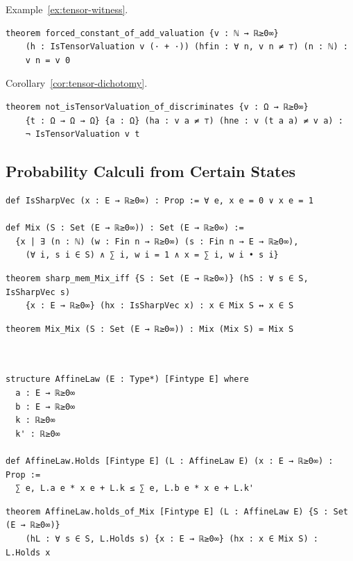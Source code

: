 \noindent Example~\ref{ex:tensor-witness}.
\label{lean:tensor-witness}
\begin{lstlisting}
theorem forced_constant_of_add_valuation {v : ℕ → ℝ≥0∞}
    (h : IsTensorValuation v (· + ·)) (hfin : ∀ n, v n ≠ ⊤) (n : ℕ) :
    v n = v 0
\end{lstlisting}

\noindent Corollary~\ref{cor:tensor-dichotomy}.
\label{lean:tensor-dichotomy}
\begin{lstlisting}
theorem not_isTensorValuation_of_discriminates {v : Ω → ℝ≥0∞}
    {t : Ω → Ω → Ω} {a : Ω} (ha : v a ≠ ⊤) (hne : v (t a a) ≠ v a) :
    ¬ IsTensorValuation v t
\end{lstlisting}
\subsection{Probability Calculi from Certain States}

\label{lean:mix}
\begin{lstlisting}
def IsSharpVec (x : E → ℝ≥0∞) : Prop := ∀ e, x e = 0 ∨ x e = 1

def Mix (S : Set (E → ℝ≥0∞)) : Set (E → ℝ≥0∞) :=
  {x | ∃ (n : ℕ) (w : Fin n → ℝ≥0∞) (s : Fin n → E → ℝ≥0∞),
    (∀ i, s i ∈ S) ∧ ∑ i, w i = 1 ∧ x = ∑ i, w i • s i}
\end{lstlisting}

\label{lean:sharp-mem-mix-iff}
\begin{lstlisting}
theorem sharp_mem_Mix_iff {S : Set (E → ℝ≥0∞)} (hS : ∀ s ∈ S, IsSharpVec s)
    {x : E → ℝ≥0∞} (hx : IsSharpVec x) : x ∈ Mix S ↔ x ∈ S
\end{lstlisting}

\label{lean:mix-mix}
\begin{lstlisting}
theorem Mix_Mix (S : Set (E → ℝ≥0∞)) : Mix (Mix S) = Mix S
\end{lstlisting}

\label{lean:affinelaw}
\begin{lstlisting}


structure AffineLaw (E : Type*) [Fintype E] where
  a : E → ℝ≥0∞
  b : E → ℝ≥0∞
  k : ℝ≥0∞
  k' : ℝ≥0∞

def AffineLaw.Holds [Fintype E] (L : AffineLaw E) (x : E → ℝ≥0∞) : Prop :=
  ∑ e, L.a e * x e + L.k ≤ ∑ e, L.b e * x e + L.k'
\end{lstlisting}

\label{lean:affinelaw-holds-of-mix}
\begin{lstlisting}
theorem AffineLaw.holds_of_Mix [Fintype E] (L : AffineLaw E) {S : Set (E → ℝ≥0∞)}
    (hL : ∀ s ∈ S, L.Holds s) {x : E → ℝ≥0∞} (hx : x ∈ Mix S) : L.Holds x
\end{lstlisting}

